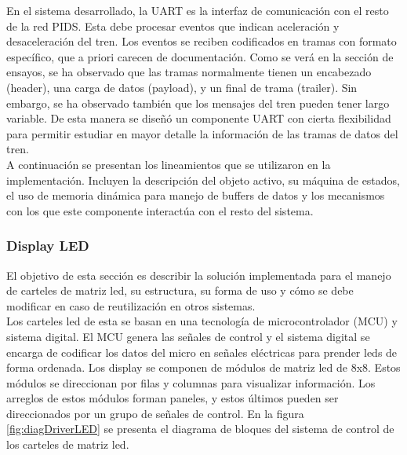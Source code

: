 En el sistema desarrollado, la UART es la interfaz de comunicación con el resto de la red PIDS. Esta debe procesar eventos que indican aceleración y desaceleración del tren. Los eventos se reciben codificados en tramas con formato específico, que a priori carecen de documentación. Como se verá en la sección de ensayos, se ha observado que las tramas normalmente tienen un encabezado (header), una carga de datos (payload), y un final de trama (trailer). Sin embargo, se ha observado también que los mensajes del tren pueden tener largo variable. De esta manera se diseñó un componente UART con cierta flexibilidad para permitir estudiar en mayor detalle la información de las tramas de datos del tren.\\

A continuación se presentan los lineamientos que se utilizaron en la implementación. Incluyen la descripción del objeto activo, su máquina de estados, el uso de memoria dinámica para manejo de buffers de datos y los mecanismos con los que este componente interactúa con el resto del sistema.\\


\pagebreak
\subsubsection{Display LED}

El objetivo de esta sección es describir la solución implementada para el manejo de carteles de matriz led, su estructura, su forma de uso y cómo se debe modificar en caso de reutilización en otros sistemas.\\

Los carteles led de esta se basan en una tecnología de microcontrolador (MCU) y sistema digital. El MCU genera las señales de control y el sistema digital se encarga de codificar los datos del micro en señales eléctricas para prender leds de forma ordenada. Los display se componen de módulos de matriz led de 8x8. Estos módulos se direccionan por filas y columnas para  visualizar información. Los arreglos de estos módulos forman paneles, y estos últimos pueden ser direccionados por un grupo de señales de control. En la figura \ref{fig:diagDriverLED} se presenta el diagrama de bloques del sistema de control de los carteles de matriz led.\\


